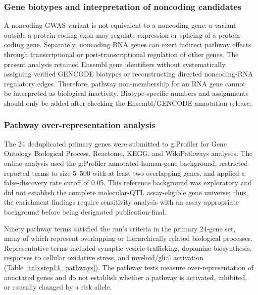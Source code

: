\documentclass[11pt,a4paper]{article}
\begin{document}
\subsubsection{Gene biotypes and interpretation of noncoding candidates}
A noncoding GWAS variant is not equivalent to a noncoding gene: a variant outside a protein-coding exon may regulate expression or splicing of a protein-coding gene. Separately, noncoding RNA genes can exert indirect pathway effects through transcriptional or post-transcriptional regulation of other genes. The present analysis retained Ensembl gene identifiers without systematically assigning verified GENCODE biotypes or reconstructing directed noncoding-RNA regulatory edges. Therefore, pathway non-membership for an RNA gene cannot be interpreted as biological inactivity. Biotype-specific numbers and assignments should only be added after checking the Ensembl/GENCODE annotation release.

\subsubsection{Pathway over-representation analysis}
The 24 deduplicated primary genes were submitted to g:Profiler for Gene Ontology Biological Process, Reactome, KEGG, and WikiPathways analyses. The online analysis used the g:Profiler annotated-human-gene background, restricted reported terms to size 5--500 with at least two overlapping genes, and applied a false-discovery rate cutoff of 0.05. This reference background was exploratory and did not establish the complete molecular-QTL assay-eligible gene universe; thus, the enrichment findings require sensitivity analysis with an assay-appropriate background before being designated publication-final.

Ninety pathway terms satisfied the run's criteria in the primary 24-gene set, many of which represent overlapping or hierarchically related biological processes. Representative terms included synaptic vesicle trafficking, dopamine biosynthesis, responses to cellular oxidative stress, and myeloid/glial activation (Table~\ref{tab:step14_pathways}). The pathway tests measure over-representation of annotated genes and do not establish whether a pathway is activated, inhibited, or causally changed by a risk allele.
\end{document}
